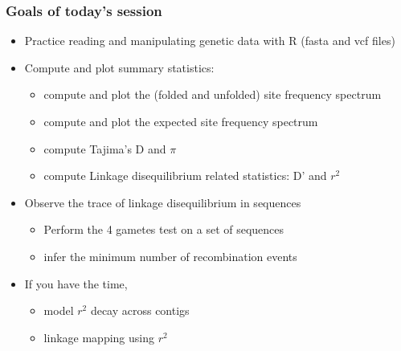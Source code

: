 \documentclass[8pt]{beamer}
\begin{document}
\begin{frame}
    \frametitle{Goals of today's session}

    \begin{itemize}
    
        \item Practice reading and manipulating genetic data with R (fasta and vcf files)

    \item Compute and plot summary statistics:
        \begin{itemize}
            \setlength\itemsep{2pt}
        
            \item compute and plot the (folded and unfolded) site frequency spectrum
            \item compute and plot the expected site frequency spectrum
            \item compute Tajima's D and $\pi$
            \item compute Linkage disequilibrium related statistics: D' and $r^2$
        
        \end{itemize}

    \item Observe the trace of linkage disequilibrium in sequences
        \begin{itemize}
            \setlength\itemsep{2pt}
            \item Perform the 4 gametes test on a set of sequences
            \item infer the minimum number of recombination events
        \end{itemize}

    \item If you have the time,
        \begin{itemize}
            \setlength\itemsep{2pt}
            \item model $r^2$ decay across contigs
            \item linkage mapping using $r^2$
        \end{itemize}

    \end{itemize}

\end{frame}
\end{document}
